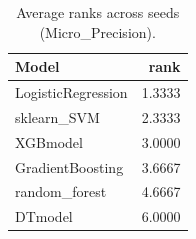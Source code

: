 \begin{table}[t]
\centering
\begin{tabular}{lr}
\toprule
Model & rank \\
\midrule
LogisticRegression & 1.3333 \\
sklearn_SVM & 2.3333 \\
XGBmodel & 3.0000 \\
GradientBoosting & 3.6667 \\
random_forest & 4.6667 \\
DTmodel & 6.0000 \\
\bottomrule
\end{tabular}
\caption{Average ranks across seeds (Micro_Precision).}
\label{tab:avg_rank_Micro_Precision}
\end{table}